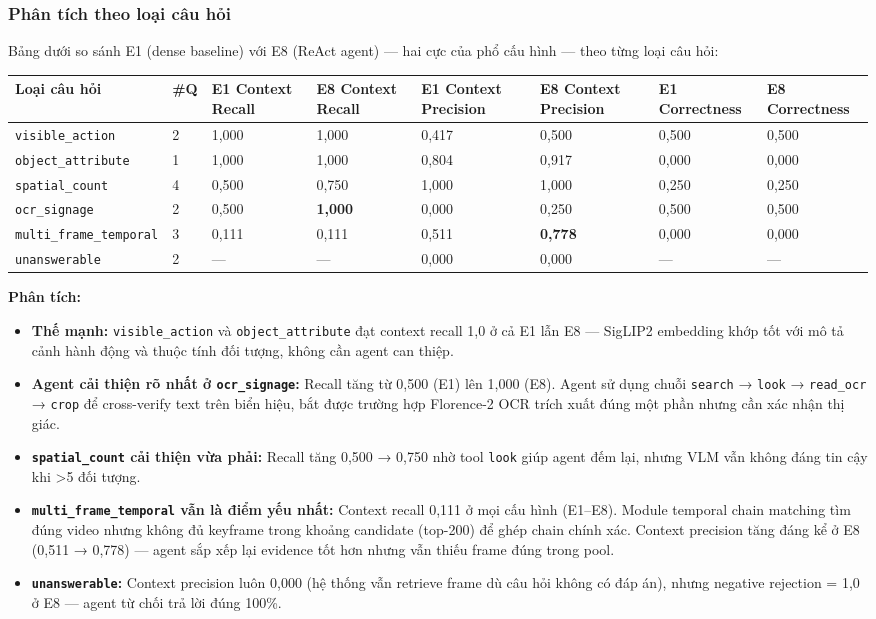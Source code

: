 \documentclass[12pt,a4paper,onecolumn]{article}
\begin{document}
\subsubsection{Phân tích theo loại câu hỏi}

Bảng dưới so sánh E1 (dense baseline) với E8 (ReAct agent) — hai cực của phổ cấu hình — theo từng loại câu hỏi:

\noindent
{\scriptsize
\begin{tabularx}{\textwidth}{Y l l l l l l l}
\toprule
Loại câu hỏi & \#Q & E1 Context Recall & E8 Context Recall & E1 Context Precision & E8 Context Precision & E1 Correctness & E8 Correctness \\
\midrule
\texttt{visible\_action} & 2 & 1,000 & 1,000 & 0,417 & 0,500 & 0,500 & 0,500 \\
\texttt{object\_attribute} & 1 & 1,000 & 1,000 & 0,804 & 0,917 & 0,000 & 0,000 \\
\texttt{spatial\_count} & 4 & 0,500 & 0,750 & 1,000 & 1,000 & 0,250 & 0,250 \\
\texttt{ocr\_signage} & 2 & 0,500 & \textbf{1,000} & 0,000 & 0,250 & 0,500 & 0,500 \\
\texttt{multi\_frame\_temporal} & 3 & 0,111 & 0,111 & 0,511 & \textbf{0,778} & 0,000 & 0,000 \\
\texttt{unanswerable} & 2 & — & — & 0,000 & 0,000 & — & — \\
\bottomrule
\end{tabularx}
}


\textbf{Phân tích:}

\begin{itemize}
  \item \textbf{Thế mạnh:} \texttt{visible\_action} và \texttt{object\_attribute} đạt context recall 1,0 ở cả E1 lẫn E8 — SigLIP2 embedding khớp tốt với mô tả cảnh hành động và thuộc tính đối tượng, không cần agent can thiệp.
  \item \textbf{Agent cải thiện rõ nhất ở \texttt{ocr\_signage}:} Recall tăng từ 0,500 (E1) lên 1,000 (E8). Agent sử dụng chuỗi \texttt{search} → \texttt{look} → \texttt{read\_ocr} → \texttt{crop} để cross-verify text trên biển hiệu, bắt được trường hợp Florence-2 OCR trích xuất đúng một phần nhưng cần xác nhận thị giác.
  \item \textbf{\texttt{spatial\_count} cải thiện vừa phải:} Recall tăng 0,500 → 0,750 nhờ tool \texttt{look} giúp agent đếm lại, nhưng VLM vẫn không đáng tin cậy khi >5 đối tượng.
  \item \textbf{\texttt{multi\_frame\_temporal} vẫn là điểm yếu nhất:} Context recall 0,111 ở mọi cấu hình (E1–E8). Module temporal chain matching tìm đúng video nhưng không đủ keyframe trong khoảng candidate (top-200) để ghép chain chính xác. Context precision tăng đáng kể ở E8 (0,511 → 0,778) — agent sắp xếp lại evidence tốt hơn nhưng vẫn thiếu frame đúng trong pool.
  \item \textbf{\texttt{unanswerable}:} Context precision luôn 0,000 (hệ thống vẫn retrieve frame dù câu hỏi không có đáp án), nhưng negative rejection = 1,0 ở E8 — agent từ chối trả lời đúng 100\%.
\end{itemize}
\end{document}
